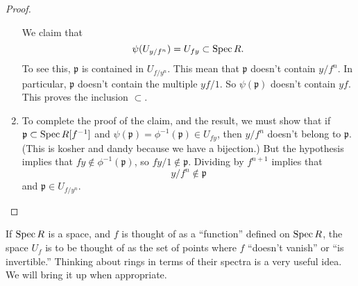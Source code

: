 \begin{proof}
\begin{enumerate}
We claim that
\[ \psi(U_{y/f^n}) = U_{fy} \subset \operatorname{Spec} R.  \]
To see this, $\mathfrak{p}$ is contained in $U_{f/y^n}$. This
mean that
$\mathfrak{p}$ doesn't contain $y/f^n$. In particular,
$\mathfrak{p}$ doesn't
contain the multiple $yf/1$. So $\psi(\mathfrak{p})$ doesn't
contain $yf$.
This proves the inclusion $\subset$.  

\item 
To complete the proof of the claim, and
the result, we must show that if $\mathfrak{p} \subset \operatorname{Spec}
R[f^{-1}]$ and
$\psi(\mathfrak{p}) = \phi^{-1}(\mathfrak{p}) \in U_{fy}$, then
$y/f^n$ doesn't
belong to $\mathfrak{p}$. (This is kosher and dandy because we
have a bijection.) But the hypothesis implies that $fy \notin
\phi^{-1}(\mathfrak{p})$, so $fy/1 \notin \mathfrak{p}$.
Dividing by $f^{n+1}$
implies that
\[ y/f^{n} \notin \mathfrak{p}  \]
and $\mathfrak{p} \in U_{f/y^n}$. 
\end{enumerate}
\end{proof}

If $\operatorname{Spec} R$ is a space, and $f$ is thought of as a ``function''
defined on
$\operatorname{Spec} R$, the space $U_f$ is to be thought of as the set of
points where $f$
``doesn't vanish'' or ``is invertible.''
Thinking about rings in terms of their spectra is a very useful
idea. We will bring it up when appropriate.  

